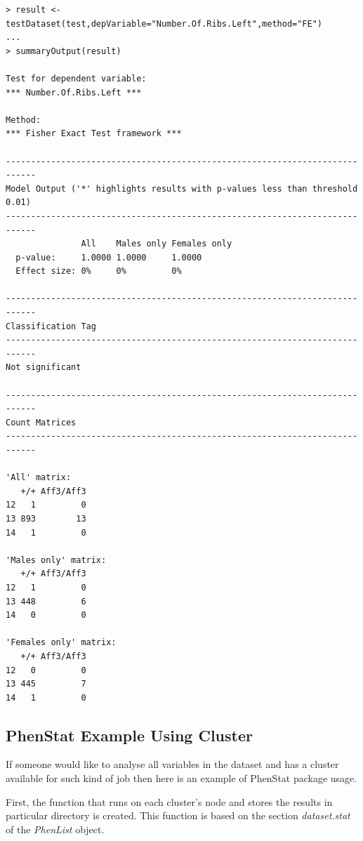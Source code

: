 \documentclass[12pt,a4paper]{article}
\begin{document}
\begingroup
\fontsize{8pt}{12pt}\selectfont
\begin{verbatim}
> result <- testDataset(test,depVariable="Number.Of.Ribs.Left",method="FE")
...
> summaryOutput(result)

Test for dependent variable:
*** Number.Of.Ribs.Left ***

Method:
*** Fisher Exact Test framework ***

----------------------------------------------------------------------------
Model Output ('*' highlights results with p-values less than threshold 0.01)
----------------------------------------------------------------------------
               All    Males only Females only
  p-value:     1.0000 1.0000     1.0000      
  Effect size: 0%     0%         0%          

----------------------------------------------------------------------------
Classification Tag
----------------------------------------------------------------------------
Not significant

----------------------------------------------------------------------------
Count Matrices
----------------------------------------------------------------------------

'All' matrix:
   +/+ Aff3/Aff3
12   1         0
13 893        13
14   1         0

'Males only' matrix:
   +/+ Aff3/Aff3
12   1         0
13 448         6
14   0         0

'Females only' matrix:
   +/+ Aff3/Aff3
12   0         0
13 445         7
14   1         0
\end{verbatim}
\endgroup 


\subsection{PhenStat Example Using Cluster}
If someone would like to analyse all variables in the dataset and has a cluster available for such kind of job then here is an example of PhenStat package usage.

First, the function that runs on each cluster's node and stores the results in particular directory is created. This function is based on the section \textit{dataset.stat} of the \textit{PhenList} object. 
\end{document}
